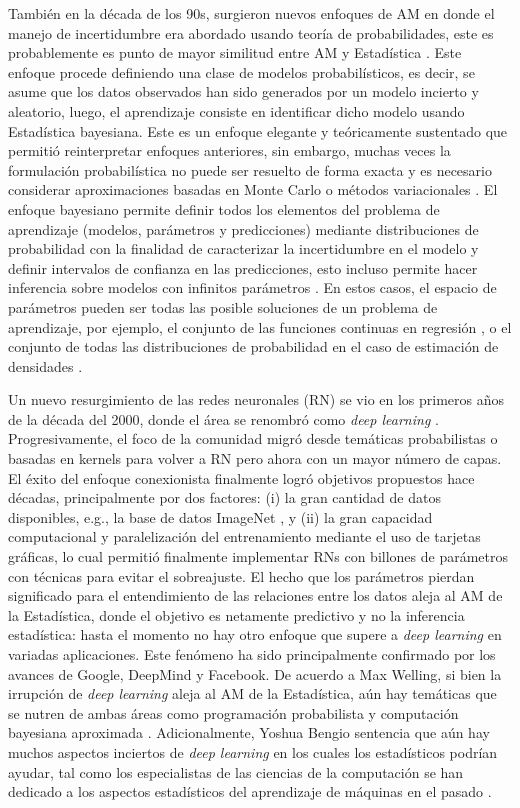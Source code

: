 También en la década de los 90s, surgieron nuevos enfoques de AM en donde el manejo de incertidumbre era abordado usando teoría de probabilidades, este es probablemente es punto de mayor similitud entre AM y Estadística \cite{ghahramani_2015}. Este enfoque procede definiendo una clase de modelos probabilísticos, es decir, se asume que los datos observados han sido generados por un modelo incierto y aleatorio, luego, el aprendizaje consiste en identificar dicho modelo usando Estadística bayesiana. Este es un enfoque elegante y teóricamente sustentado que permitió reinterpretar enfoques anteriores, sin embargo, muchas veces la formulación probabilística no puede ser resuelto de forma exacta y es necesario considerar aproximaciones basadas en Monte Carlo \cite{neal_1993} o métodos variacionales \cite{jordan_1999}. El enfoque bayesiano permite definir todos los elementos del problema de aprendizaje (modelos, parámetros y predicciones) mediante distribuciones de probabilidad con la finalidad de caracterizar la incertidumbre en el modelo y definir intervalos de confianza en las predicciones, esto incluso permite hacer inferencia sobre modelos con infinitos parámetros \cite{hjort_2010}. En estos casos, el espacio de parámetros pueden ser todas las posible soluciones de un problema de aprendizaje, por ejemplo, el conjunto de las funciones continuas en regresión \cite{rasmussen_2006}, o el conjunto de todas las distribuciones de probabilidad en el caso de estimación de densidades \cite{ferguson_1973}.

Un nuevo resurgimiento de las redes neuronales (RN) se vio en los primeros años de la década del 2000, donde el área se renombró como \emph{deep learning} \cite{bengio_2009}. Progresivamente, el foco de la comunidad migró desde temáticas probabilistas o basadas en kernels para volver a RN pero ahora con un mayor número de capas. El éxito del enfoque conexionista finalmente logró objetivos propuestos hace décadas, principalmente por dos factores: (i) la gran cantidad de datos disponibles, e.g., la base de datos ImageNet \cite{imagenet_cvpr09}, y (ii) la gran capacidad computacional y paralelización del entrenamiento mediante el uso de tarjetas gráficas, lo cual permitió finalmente implementar RNs con billones de parámetros con técnicas para evitar el sobreajuste. El hecho que los parámetros pierdan significado para el entendimiento de las relaciones entre los datos aleja al AM de la Estadística, donde el objetivo es netamente predictivo y no la inferencia estadística: hasta el momento no hay otro enfoque que supere a \emph{deep learning} en variadas aplicaciones. Este fenómeno ha sido principalmente confirmado por los avances de Google, DeepMind y Facebook. De acuerdo a Max Welling, si bien la irrupción de \emph{deep learning} aleja al AM de la Estadística, aún hay temáticas que se nutren de ambas áreas como programación probabilista y computación bayesiana aproximada \cite{welling_2015}. Adicionalmente, Yoshua Bengio sentencia que aún hay muchos aspectos inciertos de \emph{deep learning} en los cuales los estadísticos podrían ayudar, tal como los especialistas de las ciencias de la computación se han dedicado a los aspectos estadísticos del aprendizaje de máquinas en el pasado \cite{bengio_2016}. 
 


